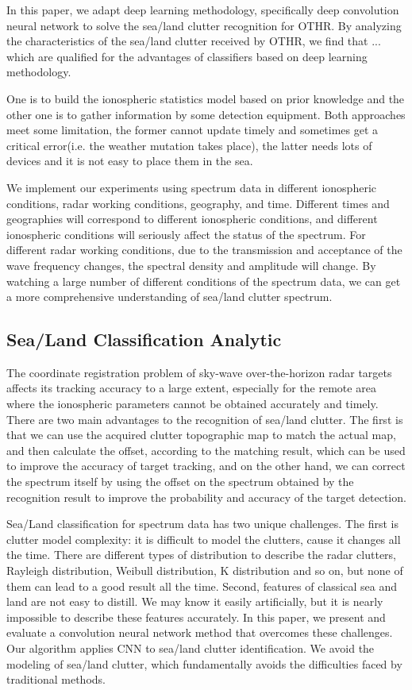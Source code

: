 In this paper, we adapt deep learning methodology, specifically deep convolution neural network to solve the sea/land clutter recognition for OTHR. By analyzing the characteristics of the sea/land clutter received by OTHR, we find that ... which are qualified for the advantages of classifiers based on deep learning methodology.


One is to build the ionospheric statistics model based on prior knowledge and the other one is to gather information by some detection equipment. Both approaches meet some limitation, the former cannot update timely and sometimes get a critical error(i.e. the weather mutation takes place), the latter needs lots of devices and it is not easy to place them in the sea.

We implement our experiments using spectrum data in different ionospheric conditions, radar working conditions, geography, and time. Different times and geographies will correspond to different ionospheric conditions, and different ionospheric conditions will seriously affect the status of the spectrum. For different radar working conditions, due to the transmission and acceptance of the wave frequency changes, the spectral density and amplitude will change. By watching a large number of different conditions of the spectrum data, we can get a more comprehensive understanding of sea/land clutter spectrum.

\subsection{Sea/Land Classification Analytic}
The coordinate registration problem of sky-wave over-the-horizon radar targets affects its tracking accuracy to a large extent, especially for the remote area where the ionospheric parameters cannot be obtained accurately and timely. There are two main advantages to the recognition of sea/land clutter. The first is that we can use the acquired clutter topographic map to match the actual map, and then calculate the offset, according to the matching result, which can be used to improve the accuracy of target tracking, and on the other hand, we can correct the spectrum itself by using the offset on the spectrum obtained by the recognition result to improve the probability and accuracy of the target detection.

Sea/Land classification for spectrum data has two unique challenges. The first is clutter model complexity: it is difficult to model the clutters, cause it changes all the time. There are different types of distribution to describe the radar clutters, Rayleigh distribution, Weibull distribution, K distribution and so on, but none of them can lead to a good result all the time. Second, features of classical sea and land are not easy to distill. We may know it easily artificially, but it is nearly impossible to describe these features accurately. In this paper, we present and evaluate a convolution neural network method that overcomes these challenges. Our algorithm applies CNN to sea/land clutter identification. We avoid the modeling of sea/land clutter, which fundamentally avoids the difficulties faced by traditional methods.

